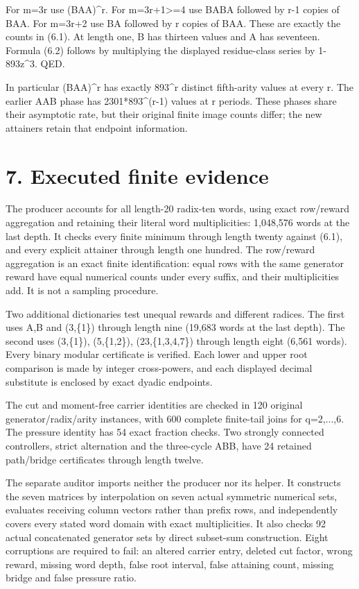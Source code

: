 For m=3r use (BAA)\^{}r. For m=3r+1\textgreater=4 use BABA followed by r-1 copies of BAA. For m=3r+2 use BA followed by r copies of BAA. These are exactly the counts in (6.1). At length one, B has thirteen values and A has seventeen. Formula (6.2) follows by multiplying the displayed residue-class series by 1-893z\^{}3. QED.

In particular (BAA)\^{}r has exactly 893\^{}r distinct fifth-arity values at every r. The earlier AAB phase has 2301*893\^{}(r-1) values at r periods. These phases share their asymptotic rate, but their original finite image counts differ; the new attainers retain that endpoint information.

\section{7. Executed finite evidence}\label{n28-executed-finite-evidence}

The producer accounts for all length-20 radix-ten words, using exact row/reward aggregation and retaining their literal word multiplicities: 1,048,576 words at the last depth. It checks every finite minimum through length twenty against (6.1), and every explicit attainer through length one hundred. The row/reward aggregation is an exact finite identification: equal rows with the same generator reward have equal numerical counts under every suffix, and their multiplicities add. It is not a sampling procedure.

Two additional dictionaries test unequal rewards and different radices. The first uses A,B and (3,\{1\}) through length nine (19,683 words at the last depth). The second uses (3,\{1\}), (5,\{1,2\}), (23,\{1,3,4,7\}) through length eight (6,561 words). Every binary modular certificate is verified. Each lower and upper root comparison is made by integer cross-powers, and each displayed decimal substitute is enclosed by exact dyadic endpoints.

The cut and moment-free carrier identities are checked in 120 original generator/radix/arity instances, with 600 complete finite-tail joins for q=2,...,6. The pressure identity has 54 exact fraction checks. Two strongly connected controllers, strict alternation and the three-cycle ABB, have 24 retained path/bridge certificates through length twelve.

The separate auditor imports neither the producer nor its helper. It constructs the seven matrices by interpolation on seven actual symmetric numerical sets, evaluates receiving column vectors rather than prefix rows, and independently covers every stated word domain with exact multiplicities. It also checks 92 actual concatenated generator sets by direct subset-sum construction. Eight corruptions are required to fail: an altered carrier entry, deleted cut factor, wrong reward, missing word depth, false root interval, false attaining count, missing bridge and false pressure ratio.

